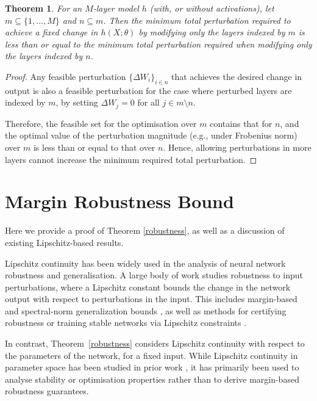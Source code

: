 \documentclass{article}
\theoremstyle{plain}
\newtheorem{theorem}{Theorem}[section]
\theoremstyle{definition}
\theoremstyle{remark}
\begin{document}
\begin{theorem}\label{multi}
For an $M$-layer model $h$ (with, or without activations), let $m \subseteq \{1, \ldots, M\}$ and $n \subseteq m$. Then the minimum total perturbation required to achieve a fixed change in $h(X; \theta)$ by modifying only the layers indexed by $m$ is less than or equal to the minimum total perturbation required when modifying only the layers indexed by $n$.
\end{theorem}
\begin{proof}
 Any feasible perturbation $\{\Delta W_i\}_{i \in n}$ that achieves the desired change in output is also a feasible perturbation for the case where perturbed layers are indexed by $m$, by setting $\Delta W_j = 0$ for all $j \in m \setminus n$.

Therefore, the feasible set for the optimisation over $m$ contains that for $n$, and the optimal value of the perturbation magnitude (e.g., under Frobenius norm) over $m$ is less than or equal to that over $n$. Hence, allowing perturbations in more layers cannot increase the minimum required total perturbation.
\end{proof}

\section{Margin Robustness Bound}\label{margin_proof}

Here we provide a proof of Theorem \ref{robustness}, as well as a discussion of existing Lipschitz-based results.

Lipschitz continuity has been widely used in the analysis of neural network robustness and generalisation. A large body of work studies robustness to input perturbations, where a Lipschitz constant bounds the change in the network output with respect to perturbations in the input. This includes margin-based and spectral-norm generalization bounds \cite{bartlett_spectrally-normalized_2017}, as well as methods for certifying robustness or training stable networks via Lipschitz constraints \citep{fazlyab_efficient_2023, pauli_training_2022}.

In contrast, Theorem~\ref{robustness} considers Lipschitz continuity with respect to the parameters of the network, for a fixed input. While Lipschitz continuity in parameter space has been studied in prior work \cite{herrera_local_2023}, it has primarily been used to analyse stability or optimisation properties rather than to derive margin-based robustness guarantees.
\end{document}
